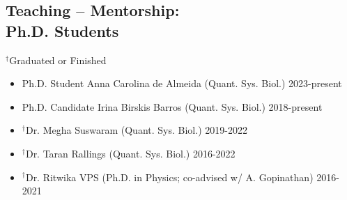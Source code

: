 \documentclass[margin,line,12pt]{res}
\begin{document}
\begin{resume}
\section{\sc Teaching -- Mentorship: \\ Ph.D. Students}
{\footnotesize{${}^\dag$Graduated or Finished}}
\begin{itemize}
  \item Ph.D. Student Anna Carolina de Almeida (Quant. Sys. Biol.) \hfill 2023-present
  \item Ph.D. Candidate Irina Birskis Barros (Quant. Sys. Biol.) \hfill 2018-present
  \item ${}^\dag$Dr. Megha Suswaram (Quant. Sys. Biol.) \hfill 2019-2022
  \item ${}^\dag$Dr. Taran Rallings (Quant. Sys. Biol.) \hfill 2016-2022
  \item ${}^\dag$Dr. Ritwika VPS (Ph.D. in Physics; co-advised w/ A. Gopinathan) \hfill 2016-2021


\end{itemize}



\end{resume}
\end{document}
